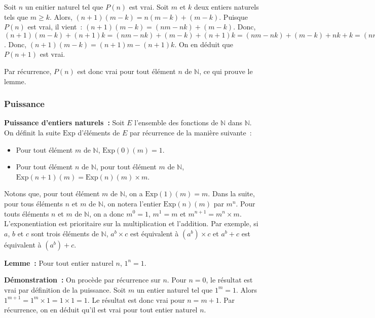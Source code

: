     Soit $n$ un enitier naturel tel que $P(n)$ est vrai. 
    Soit $m$ et $k$ deux entiers naturels tels que $m \geq k$. 
    Alors, $(n+1) (m-k) = n (m-k) + (m-k)$. 
    Puisque $P(n)$ est vrai, il vient : $(n+1)(m-k) = (n m - n k) + (m-k)$.
    Donc, $(n+1)(m-k) + (n+1) k = (n m - n k) + (m-k) + (n+1) k = (n m - n k) + (m-k) + n k + k = (n m - n k) + n k + (m-k) + k = n m + m = (n+1) m$.
    Donc, $(n+1)(m-k) = (n+1)m - (n+1) k$.
    On en déduit que $P(n+1)$ est vrai. 

    Par récurrence, $P(n)$ est donc vrai pour tout élément $n$ de $\mathbb{N}$, ce qui prouve le lemme.

    \done

\subsubsection{Puissance}
\label{subsub:puissance}

\noindent\textbf{Puissance d'entiers naturels :} Soit $E$ l'ensemble des fonctions de $\mathbb{N}$ dans $\mathbb{N}$. 
    On définit la suite $\mathrm{Exp}$ d'éléments de $E$ par récurrence de la manière suivante : 
    \begin{itemize}[nosep]
        \item Pour tout élément $m$ de $\mathbb{N}$, $\mathrm{Exp}(0)(m) = 1$.
        \item Pour tout élément $n$ de $\mathbb{N}$, pour tout élément $m$ de $\mathbb{N}$, $\mathrm{Exp}(n+1)(m) = \mathrm{Exp}(n)(m) \times m$.
    \end{itemize}
    Notons que, pour tout élément $m$ de $\mathbb{N}$, on a $\mathrm{Exp}(1)(m) = m$. 
    Dans la suite, pour tous éléments $n$ et $m$ de $\mathbb{N}$, on notera l'entier $\mathrm{Exp}(n)(m)$ par $m^n$. 
    Pour touts éléments $n$ et $m$ de $\mathbb{N}$, on a donc $m^0=1$, $m^1 = m$ et $m^{n+1} = m^n \times m$. 
    L'exponentiation est prioritaire sur la multiplication et l'addition. 
    Par exemple, si $a$, $b$ et $c$ sont trois éléments de $\mathbb{N}$, $a^b \times c$ est équivalent à $(a^b) \times c$ et $a^b + c$ est équivalent à $(a^b) + c$.

\medskip

\noindent\textbf{Lemme :} Pour tout entier naturel $n$, $1^n = 1$.

\medskip

\noindent\textbf{Démonstration :} On procède par récurrence sur $n$. 
    Pour $n = 0$, le résultat est vrai par définition de la puissance.
    Soit $m$ un entier naturel tel que $1^m = 1$. 
    Alors $1^{m+1} = 1^m \times 1 = 1 \times 1 = 1$. 
    Le résultat est donc vrai pour $n = m+1$. 
    Par récurrence, on en déduit qu'il est vrai pour tout entier naturel $n$.

